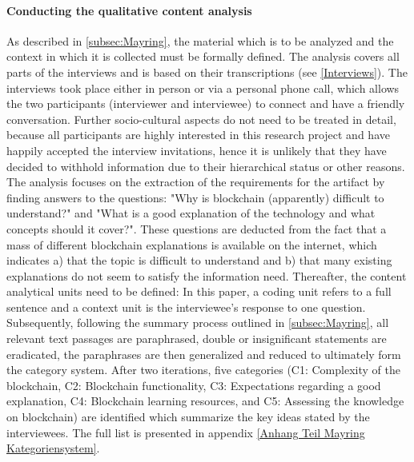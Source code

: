 \paragraph{Conducting the qualitative content analysis} As described in \ref{subsec:Mayring}, the material which is to be analyzed and the context in which it is collected must be formally defined. The analysis covers all parts of the interviews and is based on their transcriptions (see \ref{Interviews}). The interviews took place either in person or via a personal phone call, which allows the two participants (interviewer and interviewee) to connect and have a friendly conversation. Further socio-cultural aspects do not need to be treated in detail, because all participants are highly interested in this research project and have happily accepted the interview invitations, hence it is unlikely that they have decided to withhold information due to their hierarchical status or other reasons. The analysis focuses on the extraction of the requirements for the artifact by finding answers to the questions: "Why is blockchain (apparently) difficult to understand?" and "What is a good explanation of the technology and what concepts should it cover?". These questions are deducted from the fact that a mass of different blockchain explanations is available on the internet, which indicates a) that the topic is difficult to understand and b) that many existing explanations do not seem to satisfy the information need. Thereafter, the content analytical units need to be defined: In this paper, a coding unit refers to a full sentence and a context unit is the interviewee's response to one question. Subsequently, following the summary process outlined in \ref{subsec:Mayring}, all relevant text passages are paraphrased, double or insignificant statements are eradicated, the paraphrases are then generalized and reduced to ultimately form the category system. After two iterations, five categories (C1: Complexity of the blockchain, C2: Blockchain functionality, C3: Expectations regarding a good explanation, C4: Blockchain learning resources, and C5: Assessing the knowledge on blockchain) are identified which summarize the key ideas stated by the interviewees. The full list is presented in appendix \ref{Anhang Teil Mayring Kategoriensystem}.

